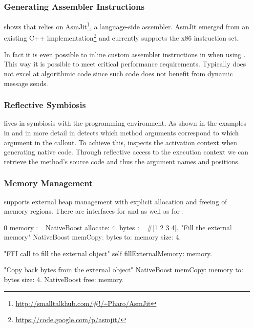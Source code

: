 \subsubsection{Generating Assembler Instructions}

 shows that \NB relies on AsmJit\footnote{\url{http://smalltalkhub.com/\#!/~Pharo/AsmJit}}, a language-side assembler.
AsmJit emerged from an existing C++ implementation\footnote{\url{https://code.google.com/p/asmjit/}} and currently supports the x86 instruction set.

In fact it is even possible to inline custom assembler instructions in \PH when using \NB.
This way it is possible to meet critical performance requirements.
Typically \ST does not excel at algorithmic code since such code does not benefit from dynamic message sends.

\subsubsection{Reflective Symbiosis}

\NB lives in symbiosis with the \PH programming environment.
As shown in the examples in  and in more detail in  \NB detects which method arguments correspond to which argument in the \FFI callout.
To achieve this, \NB inspects the activation context when generating native code.
Through reflective access to the execution context we can retrieve the method's source code and thus the argument names and positions.

\subsubsection{Memory Management}


\NB supports external heap management with explicit allocation and freeing of memory regions.
There are interfaces for  and  as well as for :
%
\begin{stcode}[
	label={lst:externalHeap},
	caption={Example of external heap management in \NB}]{0}
memory := NativeBoost allocate: 4.
bytes  := #[1 2 3 4].
"Fill the external memory"
NativeBoost memCopy: bytes to: memory size: 4.

"FFI call to fill the external object"
self fillExternalMemory: memory.

"Copy back bytes from the external object"
NativeBoost memCopy: memory to: bytes size: 4.
NativeBoost free: memory.
\end{stcode}

